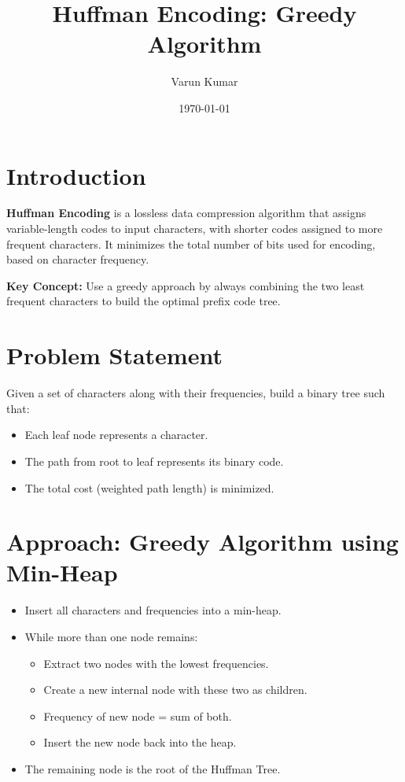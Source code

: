 \documentclass[14pt]{extarticle}
\title{Huffman Encoding: Greedy Algorithm}
\author{Varun Kumar}
\date{\today}
\begin{document}
\maketitle

\tableofcontents

\section{Introduction}
\textbf{Huffman Encoding} is a lossless data compression algorithm that assigns variable-length codes to input characters, with shorter codes assigned to more frequent characters. It minimizes the total number of bits used for encoding, based on character frequency.

\textbf{Key Concept:} Use a greedy approach by always combining the two least frequent characters to build the optimal prefix code tree.

\section{Problem Statement}
Given a set of characters along with their frequencies, build a binary tree such that:
\begin{itemize}
    \item Each leaf node represents a character.
    \item The path from root to leaf represents its binary code.
    \item The total cost (weighted path length) is minimized.
\end{itemize}

\section{Approach: Greedy Algorithm using Min-Heap}
\begin{itemize}
    \item Insert all characters and frequencies into a min-heap.
    \item While more than one node remains:
    \begin{itemize}
        \item Extract two nodes with the lowest frequencies.
        \item Create a new internal node with these two as children.
        \item Frequency of new node = sum of both.
        \item Insert the new node back into the heap.
    \end{itemize}
    \item The remaining node is the root of the Huffman Tree.
\end{itemize}
\end{document}
